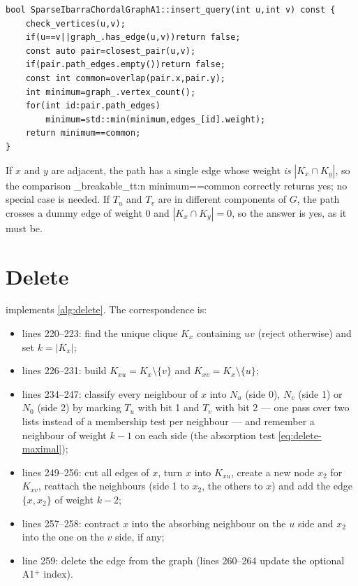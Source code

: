 \documentclass[11pt,a4paper,oneside]{report}
\theoremstyle{plain}
\theoremstyle{definition}
\theoremstyle{remark}
\newcommand{\yes}{\textsf{yes}}
\newcommand{\op}[1]{\textsf{#1}}
\DeclareRobustCommand{\code}[1]{\mtp_breakable_tt:n {#1}}
\DeclareRobustCommand{\file}[1]{\mtp_breakable_tt:n {#1}}
\begin{document}
\begin{lstlisting}[style=cpp,firstnumber=193,caption={\file{src/sparse_ibarra_a1.cpp}, lines 193--203: \op{Insert-Query} (\cref{alg:insert-query}).},label={lst:a1-insert-query}]
bool SparseIbarraChordalGraphA1::insert_query(int u,int v) const {
    check_vertices(u,v);
    if(u==v||graph_.has_edge(u,v))return false;
    const auto pair=closest_pair(u,v);
    if(pair.path_edges.empty())return false;
    const int common=overlap(pair.x,pair.y);
    int minimum=graph_.vertex_count();
    for(int id:pair.path_edges)
        minimum=std::min(minimum,edges_[id].weight);
    return minimum==common;
}
\end{lstlisting}

\noindent If \(x\) and \(y\) are adjacent, the path has a single edge whose weight \emph{is}
\(|K_x\cap K_y|\), so the comparison \code{minimum==common} correctly returns \yes; no special
case is needed. If \(T_u\) and \(T_v\) are in different components of \(G\), the path crosses a
dummy edge of weight 0 and \(|K_x\cap K_y|=0\), so the answer is \yes, as it must be.

\section{Delete}\label{sec:a1-delete}
 implements \cref{alg:delete}. The correspondence is:
\begin{itemize}
\item lines 220--223: find the unique clique \(K_x\) containing \(uv\) (reject otherwise) and
  set \(k=|K_x|\);
\item lines 226--231: build \(K_{xu}=K_x\setminus\{v\}\) and \(K_{xv}=K_x\setminus\{u\}\);
\item lines 234--247: classify every neighbour of \(x\) into \(N_u\) (side 0), \(N_v\) (side 1)
  or \(N_0\) (side 2) by marking \(T_u\) with bit 1 and \(T_v\) with bit 2 --- one pass over two
  lists instead of a membership test per neighbour --- and remember a neighbour of weight
  \(k-1\) on each side (the absorption test \eqref{eq:delete-maximal});
\item lines 249--256: cut all edges of \(x\), turn \(x\) into \(K_{xu}\), create a new node
  \(x_2\) for \(K_{xv}\), reattach the neighbours (side 1 to \(x_2\), the others to \(x\)) and
  add the edge \(\{x,x_2\}\) of weight \(k-2\);
\item lines 257--258: contract \(x\) into the absorbing neighbour on the \(u\) side and \(x_2\)
  into the one on the \(v\) side, if any;
\item line 259: delete the edge from the graph (lines 260--264 update the optional A1\(^+\)
  index).
\end{itemize}
\end{document}
